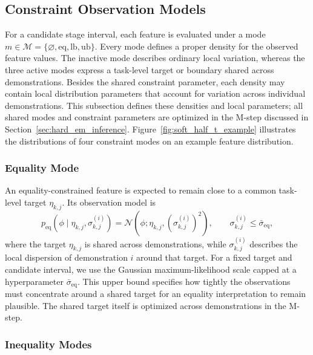 \subsection{Constraint Observation Models}
\label{sec:constraint_observation_models}

For a candidate stage interval, each feature is evaluated under a mode $m\in\mathcal{M}=\{\varnothing,\mathrm{eq},\mathrm{lb},\mathrm{ub}\}$. Every mode defines a proper density for the observed feature values. The inactive mode describes ordinary local variation, whereas the three active modes express a task-level target or boundary shared across demonstrations. Besides the shared constraint parameter, each density may contain local distribution parameters that account for variation across individual demonstrations. This subsection defines these densities and local parameters; all shared modes and constraint parameters are optimized in the M-step discussed in Section~\ref{sec:hard_em_inference}. Figure~\ref{fig:soft_half_t_example} illustrates the distributions of four constraint modes on an example feature distribution.

\subsubsection{Equality Mode}

An equality-constrained feature is expected to remain close to a common task-level target $\eta_{k,j}$. Its observation model is
\begin{equation}
p_{\mathrm{eq}}
\!\left(\phi\mid\eta_{k,j},\sigma_{k,j}^{(i)}\right)
=
\mathcal{N}
\!\left(\phi;\eta_{k,j},(\sigma_{k,j}^{(i)})^2\right),
\qquad
\sigma_{k,j}^{(i)}\leq\bar{\sigma}_{\mathrm{eq}},
\label{eq:equality_observation_model}
\end{equation}
where the target $\eta_{k,j}$ is shared across demonstrations, while $\sigma_{k,j}^{(i)}$ describes the local dispersion of demonstration $i$ around that target. For a fixed target and candidate interval, we use the Gaussian maximum-likelihood scale capped at a hyperparameter $\bar\sigma_{\mathrm{eq}}$. This upper bound specifies how tightly the observations must concentrate around a shared target for an equality interpretation to remain plausible. The shared target itself is optimized across demonstrations in the M-step.

\subsubsection{Inequality Modes}

